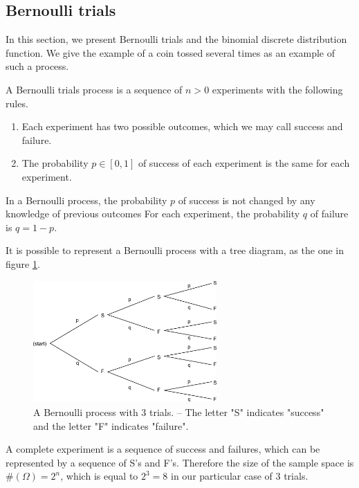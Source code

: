 \subsection{Bernoulli trials}

In this section, we present Bernoulli trials and the binomial discrete 
distribution function. We give the example of a coin tossed several times as an example 
of such a process.

\begin{definition}
A Bernoulli trials process is a sequence of $n>0$ experiments 
with the following rules.
\begin{enumerate}
\item Each experiment has two possible outcomes, which we may call
success and failure.
\item The probability $p\in[0,1]$ of success of each experiment is the same for each
experiment. 
\end{enumerate}
\end{definition}

In a Bernoulli process, the probability $p$ of success is not changed by any knowledge of previous 
outcomes
For each experiment, the probability $q$ of failure is $q=1-p$.

It is possible to represent a Bernoulli process with a tree diagram, as 
the one in figure \ref{fig-introstats-bernouillitree}.

\begin{figure}
\begin{center}
\includegraphics[width=7cm]{introdiscreteprobas/tree-Bernoulli.pdf}
\end{center}
\caption{A Bernoulli process with 3 trials. -- The letter "S" indicates "success" and the letter 
"F" indicates "failure".}
\label{fig-introstats-bernouillitree}
\end{figure}

A complete experiment is a sequence of success and failures, which can 
be represented by a sequence of S's and F's.
Therefore the size of the sample space is $\#(\Omega)=2^n$, which 
is equal to $2^3=8$ in our particular case of 3 trials.

